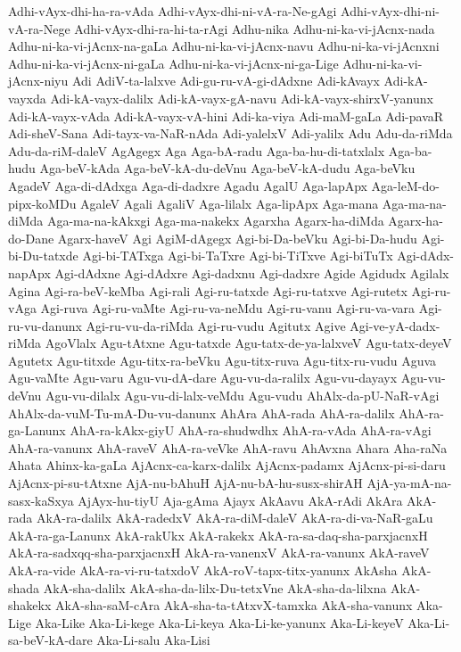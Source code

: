 {Adhi-vAyx-dhi-ha-ra-vAda
Adhi-vAyx-dhi-ni-vA-ra-Ne-gAgi
Adhi-vAyx-dhi-ni-vA-ra-Nege
Adhi-vAyx-dhi-ra-hi-ta-rAgi
Adhu-nika
Adhu-ni-ka-vi-jAcnx-nada
Adhu-ni-ka-vi-jAcnx-na-gaLa
Adhu-ni-ka-vi-jAcnx-navu
Adhu-ni-ka-vi-jAcnxni
Adhu-ni-ka-vi-jAcnx-ni-gaLa
Adhu-ni-ka-vi-jAcnx-ni-ga-Lige
Adhu-ni-ka-vi-jAcnx-niyu
Adi
AdiV-ta-lalxve
Adi-gu-ru-vA-gi-dAdxne
Adi-kAvayx
Adi-kA-vayxda
Adi-kA-vayx-dalilx
Adi-kA-vayx-gA-navu
Adi-kA-vayx-shirxV-yanunx
Adi-kA-vayx-vAda
Adi-kA-vayx-vA-hini
Adi-ka-viya
Adi-maM-gaLa
Adi-pavaR
Adi-sheV-Sana
Adi-tayx-va-NaR-nAda
Adi-yalelxV
Adi-yalilx
Adu
Adu-da-riMda
Adu-da-riM-daleV
AgAgegx
Aga
Aga-bA-radu
Aga-ba-hu-di-tatxlalx
Aga-ba-hudu
Aga-beV-kAda
Aga-beV-kA-du-deVnu
Aga-beV-kA-dudu
Aga-beVku
AgadeV
Aga-di-dAdxga
Aga-di-dadxre
Agadu
AgalU
Aga-lapApx
Aga-leM-do-pipx-koMDu
AgaleV
Agali
AgaliV
Aga-lilalx
Aga-lipApx
Aga-mana
Aga-ma-na-diMda
Aga-ma-na-kAkxgi
Aga-ma-nakekx
Agarxha
Agarx-ha-diMda
Agarx-ha-do-Dane
Agarx-haveV
Agi
AgiM-dAgegx
Agi-bi-Da-beVku
Agi-bi-Da-hudu
Agi-bi-Du-tatxde
Agi-bi-TATxga
Agi-bi-TaTxre
Agi-bi-TiTxve
Agi-biTuTx
Agi-dAdx-napApx
Agi-dAdxne
Agi-dAdxre
Agi-dadxnu
Agi-dadxre
Agide
Agidudx
Agilalx
Agina
Agi-ra-beV-keMba
Agi-rali
Agi-ru-tatxde
Agi-ru-tatxve
Agi-rutetx
Agi-ru-vAga
Agi-ruva
Agi-ru-vaMte
Agi-ru-va-neMdu
Agi-ru-vanu
Agi-ru-va-vara
Agi-ru-vu-danunx
Agi-ru-vu-da-riMda
Agi-ru-vudu
Agitutx
Agive
Agi-ve-yA-dadx-riMda
AgoVlalx
Agu-tAtxne
Agu-tatxde
Agu-tatx-de-ya-lalxveV
Agu-tatx-deyeV
Agutetx
Agu-titxde
Agu-titx-ra-beVku
Agu-titx-ruva
Agu-titx-ru-vudu
Aguva
Agu-vaMte
Agu-varu
Agu-vu-dA-dare
Agu-vu-da-ralilx
Agu-vu-dayayx
Agu-vu-deVnu
Agu-vu-dilalx
Agu-vu-di-lalx-veMdu
Agu-vudu
AhAlx-da-pU-NaR-vAgi
AhAlx-da-vuM-Tu-mA-Du-vu-danunx
AhAra
AhA-rada
AhA-ra-dalilx
AhA-ra-ga-Lanunx
AhA-ra-kAkx-giyU
AhA-ra-shudwdhx
AhA-ra-vAda
AhA-ra-vAgi
AhA-ra-vanunx
AhA-raveV
AhA-ra-veVke
AhA-ravu
AhAvxna
Ahara
Aha-raNa
Ahata
Ahinx-ka-gaLa
AjAcnx-ca-karx-dalilx
AjAcnx-padamx
AjAcnx-pi-si-daru
AjAcnx-pi-su-tAtxne
AjA-nu-bAhuH
AjA-nu-bA-hu-susx-shirAH
AjA-ya-mA-na-sasx-kaSxya
AjAyx-hu-tiyU
Aja-gAma
Ajayx
AkAavu
AkA-rAdi
AkAra
AkA-rada
AkA-ra-dalilx
AkA-radedxV
AkA-ra-diM-daleV
AkA-ra-di-va-NaR-gaLu
AkA-ra-ga-Lanunx
AkA-rakUkx
AkA-rakekx
AkA-ra-sa-daq-sha-parxjacnxH
AkA-ra-sadxqq-sha-parxjacnxH
AkA-ra-vanenxV
AkA-ra-vanunx
AkA-raveV
AkA-ra-vide
AkA-ra-vi-ru-tatxdoV
AkA-roV-tapx-titx-yanunx
AkAsha
AkA-shada
AkA-sha-dalilx
AkA-sha-da-lilx-Du-tetxVne
AkA-sha-da-lilxna
AkA-shakekx
AkA-sha-saM-cAra
AkA-sha-ta-tAtxvX-tamxka
AkA-sha-vanunx
Aka-Lige
Aka-Like
Aka-Li-kege
Aka-Li-keya
Aka-Li-ke-yanunx
Aka-Li-keyeV
Aka-Li-sa-beV-kA-dare
Aka-Li-salu
Aka-Lisi
}
